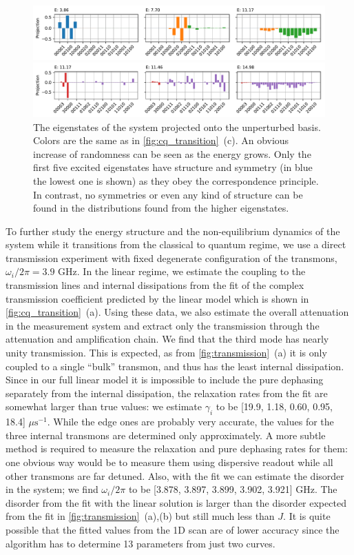 \documentclass[%
 aps, pra,
 amsmath,amssymb,
 reprint,%
superscriptaddress
]{revtex4-2}
\begin{document}
\begin{figure}[t]
	\centering
	\includegraphics[width=\linewidth]{Pictures/eigenstates1}
	
	\includegraphics[width=\linewidth]{Pictures/eigenstates2}
	\caption{The eigenstates of the system projected onto the unperturbed basis. Colors are the same as in \autoref{fig:cq_transition}~(c). An obvious increase of randomness can be seen as the energy grows. Only the first five excited eigenstates have structure and symmetry (in blue the lowest one is shown) as they obey the correspondence principle. In contrast, no symmetries or even any kind of structure can be found in the distributions found from the higher eigenstates.}
	\label{fig:eigenstates}
\end{figure}

To further study the energy structure and the non-equilibrium dynamics of the system while it transitions from the classical to quantum regime, we use a direct transmission experiment with fixed degenerate configuration of the transmons, $\omega_i/2\pi = 3.9$ GHz. In the linear regime, we estimate the coupling to the transmission lines and internal dissipations from the fit of the complex transmission coefficient predicted by the linear model which is shown in \autoref{fig:cq_transition}~(a). Using these data, we also estimate the overall attenuation in the measurement system and extract only the transmission through the attenuation and amplification chain. We find that the third mode has nearly unity transmission. This is expected, as from \autoref{fig:transmission}~(a) it is only coupled to a single ``bulk'' transmon, and thus has the least internal dissipation. Since in our full linear model it is impossible to include the pure dephasing separately from the internal dissipation, the relaxation rates from the fit are somewhat larger than true values: we estimate $\gamma_i$ to be [19.9, 1.18, 0.60, 0.95, 18.4] $\mu\text{s}^{-1}$. While the edge ones are probably very accurate, the values for the three internal transmons are determined only approximately. A more subtle method is required to measure the relaxation and pure dephasing rates for them: one obvious way would be to measure them using dispersive readout while all other transmons are far detuned. Also, with the fit we can estimate the disorder in the system; we find $\omega_i/2\pi$ to be [3.878, 3.897, 3.899, 3.902, 3.921] GHz. The disorder from the fit with the linear solution is larger than the disorder expected from the fit in \autoref{fig:transmission}~(a),(b) but still much less than $J$. It is quite possible that the fitted values from the 1D scan are of lower accuracy since the algorithm has to determine 13 parameters from just two curves.
\end{document}
